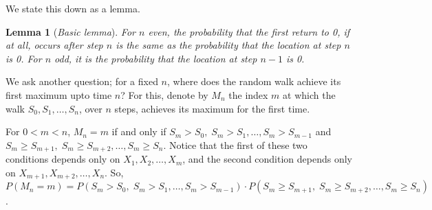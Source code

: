 \documentclass[15pt,a4paper]{book}
\newtheorem{lemma}[theorem]{Lemma}
\theoremstyle{definition}
\newcommand{\eax}[1]{\emph{#1}\index{#1}} %
\begin{document}
We state this down as a lemma.
\begin{lemma}[\eax{Basic lemma}]
    For $n$ even, the probability that the first return to 0, if at all, occurs after step $n$ is the same as the probability that the location at step $n$ is 0. For $n$ odd, it is the probability that the location at step $n-1$ is 0.
\end{lemma}
We ask another question; for a fixed $n$, where does the random walk achieve its first maximum upto time $n$? For this, denote by $M_{n}$ the index $m$ at which the walk $S_{0},S_{1},\ldots,S_{n}$, over $n$ steps, achieves its maximum for the first time.

For $0<m<n$, $M_{n}=m$ if and only if $S_{m}>S_{0},\; S_{m}>S_{1},\ldots,S_{m}>S_{m-1}$ and $S_{m} \geq S_{m+1},\; S_{m} \geq S_{m+2}, \ldots, S_{m} \geq S_{n}$. Notice that the first of these two conditions depends only on $X_{1},X_{2},\ldots,X_{m}$, and the second condition depends only on $X_{m+1},X_{m+2},\ldots,X_{n}$. So, $P(M_{n}=m) = P(S_{m}>S_{0},\; S_{m}>S_{1},\ldots,S_{m}>S_{m-1}) \cdot P(S_{m} \geq S_{m+1},\; S_{m} \geq S_{m+2}, \ldots, S_{m} \geq S_{n})$.
\end{document}
